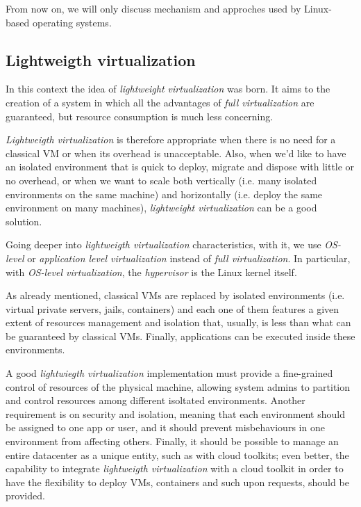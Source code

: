 \begin{note}
    From now on, we will only discuss mechanism and approches used by Linux-based
    operating systems.
\end{note}

\subsection{Lightweigth virtualization}
In this context the idea of \emph{lightweight virtualization} was born. It aims
to the creation of a system in which all the advantages of \emph{full
virtualization} are guaranteed, but resource consumption is much less concerning.

\emph{Lightweigth virtualization} is therefore appropriate when there is no need
for a classical VM or when its overhead is unacceptable. Also, when we'd like to
have an isolated environment that is quick to deploy, migrate and dispose with
little or no overhead, or when we want to scale both vertically (i.e. many
isolated environments on the same machine) and horizontally (i.e. deploy the
same environment on many machines), \emph{lightweight virtualization} can be a
good solution.

\bigskip\noindent
Going deeper into \emph{lightweigth virtualization} characteristics, with it,
we use \emph{OS-level} or \emph{application level virtualization} instead of
\emph{full virtualization}. In particular, with \emph{OS-level virtualization},
the \emph{hypervisor} is the Linux kernel itself.

As already mentioned, classical VMs are replaced by isolated environments (i.e.
virtual private servers, jails, containers) and each one of them features a
given extent of resources management and isolation that, usually, is less than
what can be guaranteed by classical VMs. Finally, applications can be executed
inside these environments.

A good \emph{lightwiegth virtualization} implementation must provide a
fine-grained control of resources of the physical machine, allowing system
admins to partition and control resources among different isoltated environments.
Another requirement is on security and isolation, meaning that each environment
should be assigned to one app or user, and it should prevent misbehaviours in
one environment from affecting others. Finally, it should be possible to manage
an entire datacenter as a unique entity, such as with cloud toolkits; even better,
the capability to integrate \emph{lightweigth virtualization} with a cloud
toolkit in order to have the flexibility to deploy VMs, containers and such upon
requests, should be provided.

